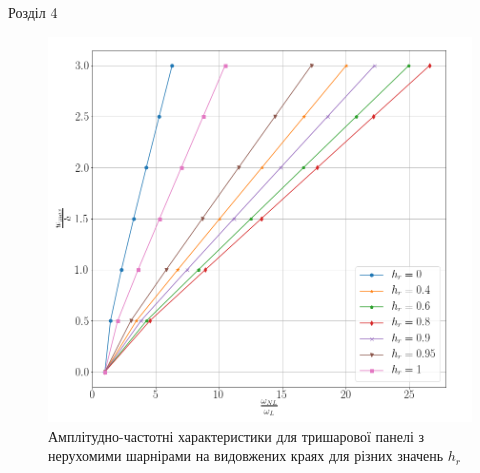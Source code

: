 \documentclass[8pt]{beamer}
\numberwithin{figure}{section}
\numberwithin{equation}{section}
\numberwithin{table}{section}
\begin{document}
\begin{frame}{Розділ 4}

\begin{figure}
	\includegraphics[scale=0.2]{pic/AFR_layered2.png}
		\caption{Амплітудно-частотні характеристики для тришарової панелі з нерухомими шарнірами на видовжених краях для різних значень $h_{r}$}
		\label{fig:AFR_layers}
\end{figure}


\end{frame}
\end{document}
